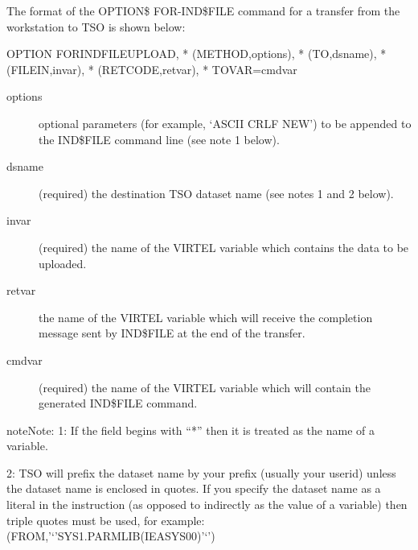 \documentclass[letterpaper,10pt,english]{sphinxmanual}
\begin{document}
The format of the OPTION\$ FOR-IND\$FILE command for a transfer from the workstation to TSO is shown below:

\begin{sphinxVerbatim}[commandchars=\\\{\}]
OPTION\PYGZdl{} FOR\PYGZhy{}IND\PYGZdl{}FILE\PYGZhy{}UPLOAD,                      *
    (METHOD,\PYGZsq{}options\PYGZsq{}),                           *
    (TO,\PYGZsq{}dsname\PYGZsq{}),                                *
    (FILE\PYGZhy{}IN,\PYGZsq{}invar\PYGZsq{}),                            *
    (RET\PYGZhy{}CODE,\PYGZsq{}retvar\PYGZsq{}),                          *
    TOVAR=\PYGZsq{}cmdvar\PYGZsq{}
\end{sphinxVerbatim}
\begin{description}
\item[{options}] \leavevmode
optional parameters (for example, ‘ASCII CRLF NEW’) to be appended to the IND\$FILE command line (see note 1 below).

\item[{dsname}] \leavevmode
(required) the destination TSO dataset name (see notes 1 and 2 below).

\item[{invar}] \leavevmode
(required) the name of the VIRTEL variable which contains the data to be uploaded.

\item[{retvar}] \leavevmode
the name of the VIRTEL variable which will receive the completion message sent by IND\$FILE at the end of the transfer.

\item[{cmdvar}] \leavevmode
(required) the name of the VIRTEL variable which will contain the generated IND\$FILE command.

\end{description}

\begin{sphinxadmonition}{note}{Note:}
1: If the field begins with “*” then it is treated as the name of a variable.

2: TSO will prefix the dataset name by your prefix (usually your userid) unless the dataset name is enclosed in quotes. If you specify the dataset name as a literal in the instruction (as opposed to indirectly as the value of a variable) then triple quotes must be used, for example: (FROM,’‘’SYS1.PARMLIB(IEASYS00)’‘’)
\end{sphinxadmonition}

\end{document}
